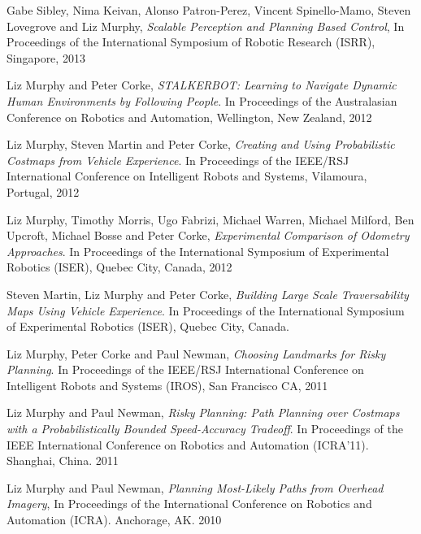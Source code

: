 \documentclass[10pt]{article}
\newcommand{\blankline}{\quad\pagebreak[2]}
\begin{document}
\blankline

Gabe Sibley, Nima Keivan, Alonso Patron-Perez, Vincent Spinello-Mamo, Steven Lovegrove and Liz Murphy, \textit{Scalable Perception and Planning Based Control}, In Proceedings of the International Symposium of Robotic Research (ISRR), Singapore, 2013 

\blankline

Liz Murphy and Peter Corke, \textit{STALKERBOT: Learning to Navigate Dynamic Human Environments by Following People}.  In Proceedings of the Australasian Conference on Robotics and Automation, Wellington, New Zealand, 2012  

\blankline

Liz Murphy, Steven Martin and Peter Corke, \textit{Creating and Using Probabilistic Costmaps from Vehicle Experience}. In Proceedings of the IEEE/RSJ International Conference on Intelligent Robots and Systems, Vilamoura, Portugal, 2012

\blankline

Liz Murphy, Timothy Morris, Ugo Fabrizi, Michael Warren, Michael Milford, Ben Upcroft, Michael Bosse and Peter Corke, \textit{Experimental Comparison of Odometry Approaches}. In Proceedings of the International Symposium of Experimental Robotics (ISER), Quebec City, Canada, 2012

\blankline

Steven Martin, Liz Murphy and Peter Corke, \textit{Building Large Scale Traversability Maps Using Vehicle Experience}. In Proceedings of the International Symposium of Experimental Robotics (ISER), Quebec City, Canada.

\blankline

Liz Murphy, Peter Corke and Paul Newman, \textit{Choosing Landmarks for Risky Planning}. In Proceedings of the IEEE/RSJ International Conference on Intelligent Robots and Systems (IROS), San Francisco CA, 2011

\blankline

Liz Murphy and Paul Newman, \textit{Risky Planning: Path Planning over Costmaps with a Probabilistically Bounded Speed-Accuracy Tradeoff}. In Proceedings of the IEEE International Conference on Robotics and Automation (ICRA'11). Shanghai, China. 2011

\blankline

Liz Murphy and Paul Newman, \textit{Planning Most-Likely Paths from Overhead Imagery}, In Proceedings of the International Conference on Robotics and Automation (ICRA). Anchorage, AK. 2010
\end{document}
